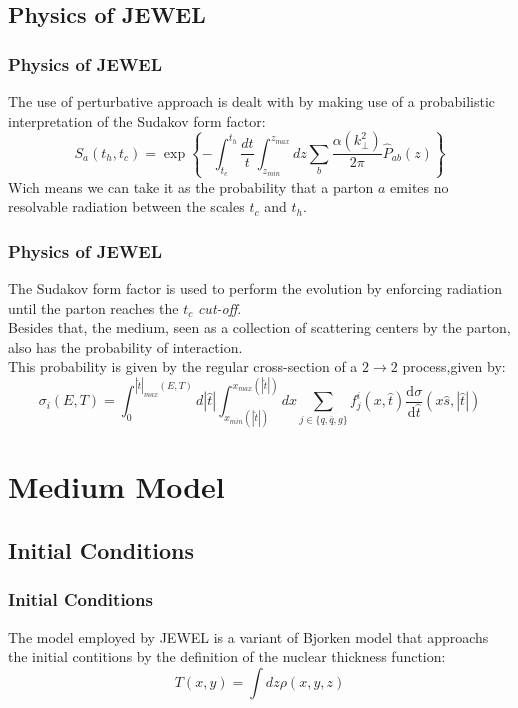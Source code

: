 \documentclass{beamer}
\begin{document}
\subsection{Physics of JEWEL}

\begin{frame}\frametitle{Physics of JEWEL}
	The use of perturbative approach is dealt with by making use of a probabilistic interpretation
	of the Sudakov form factor:
	\begin{equation}
	S_a(t_h,t_c) = \exp \left\{ -\int_{t_c}^{t_h} \frac{dt}{t} \int_{z_{min}}^{z_{max}} dz \sum_b \frac{\alpha(k_{\bot}^2)}{2\pi} \hat{P}_{ab}(z) \right\}
	\end{equation}
	\pause
	Wich means we can take it as the probability that a parton $a$ emites no resolvable radiation
	between the scales $t_c$ and $t_h$.
\end{frame}

\begin{frame}\frametitle{Physics of JEWEL}
	The Sudakov form factor is used to perform the evolution by enforcing radiation until the
	parton reaches the $t_c$ \textit{cut-off}.
	\\ \pause
	Besides that, the medium, seen as a collection of scattering centers by the parton, also has
	the probability of interaction.
	\\ \pause
	This probability is given by the regular cross-section of a $2 \rightarrow 2$ process,given by:
	\begin{equation}
	\sigma_i(E,T)=\int_{0}^{|\hat{t}|_{max}(E,T)}d|\hat{t}|\int_{x_{min}(|\hat{t}|)}^{x_{max}(|\hat{t}|)} dx \sum_{j \in \{ q,\overline{q},g\}} f_{j}^{i}(x,\hat{t})\frac{\mathrm{d}\sigma}{\mathrm{d}\hat{t}}(x\hat{s},|\hat{t}|)
	\end{equation}
\end{frame}

\section{Medium Model}
\subsection{Initial Conditions}

\begin{frame}\frametitle{Initial Conditions}
	The model employed by JEWEL is a variant of Bjorken model that
	approachs the initial contitions by the definition of the nuclear thickness 
	function:
	\begin{equation}
	T(x,y) = \int dz \rho(x,y,z)
	\end{equation}
\end{frame}
\end{document}
